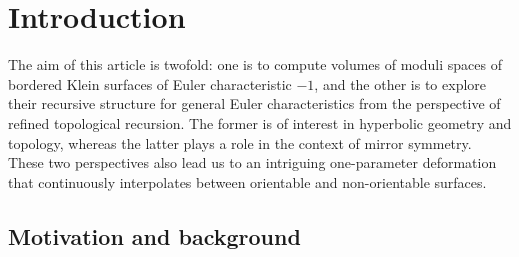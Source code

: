\documentclass[12pt]{amsart}
\theoremstyle{plain}
\theoremstyle{definition}
\theoremstyle{remark}
\numberwithin{equation}{section}
\begin{document}
\begin{abstract}
\end{abstract}

\maketitle	


\tableofcontents	

\newpage

\section{Introduction}\label{sec:intro}

The aim of this article is twofold: one is to compute volumes of moduli spaces of bordered Klein surfaces of Euler characteristic $-1$, and the other is to explore their recursive structure for general Euler characteristics from the perspective of refined topological recursion. The former is of interest in hyperbolic geometry and topology, whereas the latter plays a role in the context of mirror symmetry. These two perspectives also lead us to an intriguing one-parameter deformation that continuously interpolates between orientable and non-orientable surfaces.


\subsection{Motivation and background}
\end{document}
